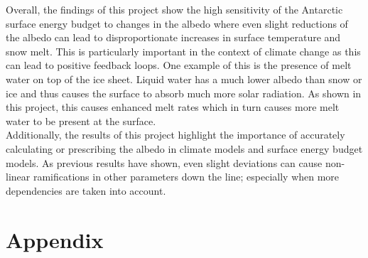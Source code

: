 \documentclass{article}
\begin{document}
Overall, the findings of this project show the high sensitivity of the Antarctic surface energy budget to changes in the albedo where even slight reductions of the albedo can lead to disproportionate increases in surface temperature and snow melt. 
This is particularly important in the context of climate change as this can lead to positive feedback loops. 
One example of this is the presence of melt water on top of the ice sheet. 
Liquid water has a much lower albedo than snow or ice and thus causes the surface to absorb much more solar radiation. 
As shown in this project, this causes enhanced melt rates which in turn causes more melt water to be present at the surface. \\
Additionally, the results of this project highlight the importance of accurately calculating or prescribing the albedo in climate models and surface energy budget models. 
As previous results have shown, even slight deviations can cause non-linear ramifications in other parameters down the line; especially when more dependencies are taken into account.\\



\printbibliography



\section*{Appendix}


\end{document}
